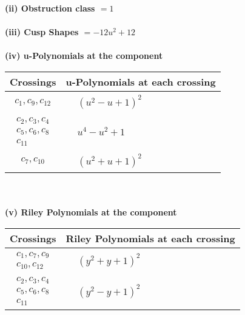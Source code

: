 \documentclass[1p]{elsarticle_modified}
\theoremstyle{definition}
\begin{document}
\flushleft \textbf{(ii) Obstruction class $= 1$}\\~\\
\flushleft \textbf{(iii) Cusp Shapes $= -12 u^2+12$}\\~\\
\newpage\renewcommand{\arraystretch}{1}
\flushleft \textbf{(iv) u-Polynomials at the component}\newline \\
\begin{tabular}{m{50pt}|m{274pt}}
Crossings & \hspace{64pt}u-Polynomials at each crossing \\
\hline $$\begin{aligned}c_{1},c_{9},c_{12}\end{aligned}$$&$\begin{aligned}
&(u^2- u+1)^2
\end{aligned}$\\
\hline $$\begin{aligned}c_{2},c_{3},c_{4}\\c_{5},c_{6},c_{8}\\c_{11}\end{aligned}$$&$\begin{aligned}
&u^4- u^2+1
\end{aligned}$\\
\hline $$\begin{aligned}c_{7},c_{10}\end{aligned}$$&$\begin{aligned}
&(u^2+u+1)^2
\end{aligned}$\\
\hline
\end{tabular}\\~\\
\newpage\renewcommand{\arraystretch}{1}
\flushleft \textbf{(v) Riley Polynomials at the component}\newline \\
\begin{tabular}{m{50pt}|m{274pt}}
Crossings & \hspace{64pt}Riley Polynomials at each crossing \\
\hline $$\begin{aligned}c_{1},c_{7},c_{9}\\c_{10},c_{12}\end{aligned}$$&$\begin{aligned}
&(y^2+y+1)^2
\end{aligned}$\\
\hline $$\begin{aligned}c_{2},c_{3},c_{4}\\c_{5},c_{6},c_{8}\\c_{11}\end{aligned}$$&$\begin{aligned}
&(y^2- y+1)^2
\end{aligned}$\\
\hline
\end{tabular}\\~\\
\end{document}
